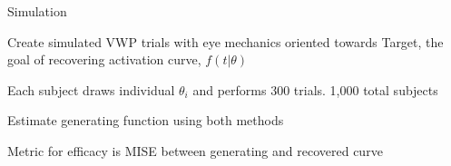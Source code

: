 \documentclass{beamer}
\providecommand{\cn}[1]{\textcolor{blue}{#1}}
\begin{document}
\begin{frame}{Simulation}

Create simulated VWP trials with eye mechanics oriented towards Target, the goal of recovering activation curve, $f(t|\theta)$ \vspace{4mm}

Each subject draws individual $\theta_i$ and performs 300 trials. 1,000 total subjects \vspace{4mm}

Estimate generating function using both  methods \vspace{4mm}

Metric for efficacy is MISE between generating and recovered curve
\end{frame}


%
%
%
%
%
%
\end{document}
